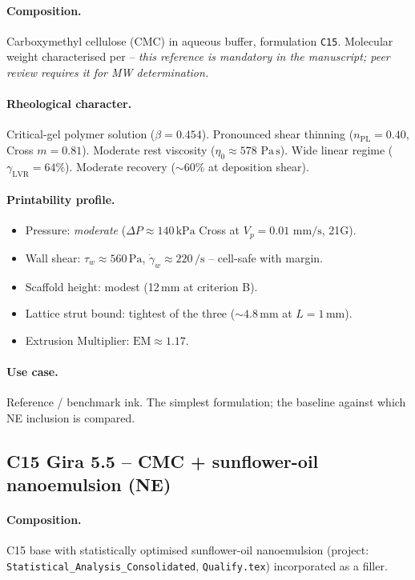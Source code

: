 \documentclass[11pt,a4paper]{article}
\newcommand{\gd}{\dot{\gamma}}
\newcommand{\Pas}{\,\mathrm{Pa\,s}}
\newcommand{\mms}{\,\mathrm{mm/s}}
\begin{document}
\paragraph{Composition.} Carboxymethyl cellulose (CMC) in aqueous
buffer, formulation \texttt{C15}. Molecular weight characterised per
\citet{daSilva2018} -- \emph{this reference is mandatory in the
manuscript; peer review requires it for MW determination.}

\paragraph{Rheological character.} Critical-gel polymer solution
($\beta=0.454$). Pronounced shear thinning ($n_\mathrm{PL}=0.40$,
Cross $m=0.81$). Moderate rest viscosity ($\eta_0\approx 578\,\Pas$).
Wide linear regime ($\gamma_\mathrm{LVR}=64\%$). Moderate recovery
($\sim 60\%$ at deposition shear).

\paragraph{Printability profile.}
\begin{itemize}[leftmargin=1.4em,itemsep=2pt]
\item Pressure: \emph{moderate} ($\Delta P\approx 140\,\si{\kPa}$
  Cross at $V_p=0.01\,\mms$, 21G).
\item Wall shear: $\tau_w\approx 560\,\si{\Pa}$,
  $\gd_w\approx 220\,\si{\per\s}$ -- cell-safe with margin.
\item Scaffold height: modest (12\,\si{\mm} at criterion B).
\item Lattice strut bound: tightest of the three ($\sim 4.8\,\si{\mm}$
  at $L=1\,\si{\mm}$).
\item Extrusion Multiplier: $\mathrm{EM}\approx 1.17$.
\end{itemize}

\paragraph{Use case.} Reference / benchmark ink. The simplest
formulation; the baseline against which NE inclusion is compared.

\subsection{C15 Gira 5.5 -- CMC + sunflower-oil nanoemulsion (NE)}

\paragraph{Composition.} C15 base with statistically optimised
sunflower-oil nanoemulsion (project: \texttt{Statistical\_Analysis\_Consolidated},
\texttt{Qualify.tex}) incorporated as a filler.
\end{document}
